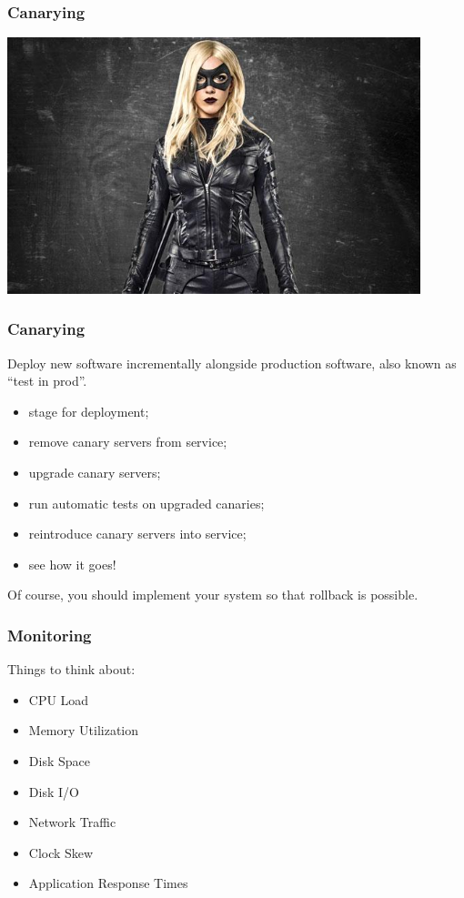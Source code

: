\begin{frame}
\frametitle{Canarying}

\begin{center}
	\includegraphics[width=0.9\textwidth]{images/blackcanary.jpg}
\end{center}

\end{frame}



\begin{frame}
\frametitle{Canarying}

Deploy new software incrementally alongside production software, also known as ``test in prod''. 


\begin{itemize}
\item stage for deployment;
\item remove canary servers from service;
\item upgrade canary servers;
\item run automatic tests on upgraded canaries;
\item reintroduce canary servers into service;
\item see how it goes!
\end{itemize}


Of course, you should implement your system so that rollback is possible.

\end{frame}



\begin{frame}
\frametitle{Monitoring}
Things to think about:

\begin{itemize}
	\item CPU Load
	\item Memory Utilization
	\item Disk Space
	\item Disk I/O
	\item Network Traffic
	\item Clock Skew
	\item Application Response Times
\end{itemize}


\end{frame}



